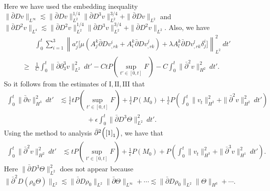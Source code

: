 \documentclass[12pt,a4paper]{amsart}
\numberwithin{equation}{section}
\theoremstyle{plain}
\theoremstyle{definition}
\newcommand{\bpartial}{\bar{\partial}}
\begin{document}
Here we have used the embedding inequality
$\|\bpartial Dv\|_{L^{\infty}}\lesssim\|\bpartial Dv\|_{L^2}^{1/4}\|\bpartial D^3v\|_{L^2}^{3/4}+\|\bpartial Dv\|_{L^2}$ and $\|\bpartial D^2v\|_{L^4}\lesssim\|\bpartial D^2v\|_{L^2}^{1/4}\|\bpartial D^3v\|_{L^2}^{3/4}+\|\bpartial D^2v\|_{L^2}$. Also, we have
\begin{align*}
&\int_{0}^{t}\sum\limits_{i=1}^3\left\| a^r_j\Big[\mu (A^{k}_j  \bpartial Dv^i_{,rk}+A^k_i \bpartial Dv^j_{,rk})+\lambda A_l^k \bpartial Dv^l_{,rk}\delta^i_j\Big]   \right\|_{L^2}^2 \ dt'\\
\geq & \frac{1}{C}\int_{0}^{t}\|\bpartial \partial_3^3 v\|_{L^2}^2 \ dt'-CtP(\sup\limits_{t'\in[0,t]}F)-C\int_{0}^{t} \|\bpartial^2 v\|_{H^2}^2 \ dt'.
\end{align*}
So it follows from the estimates of $\mathrm{I},\mathrm{II},\mathrm{III}$ that
\begin{equation}
\label{dvxxx2}
\begin{aligned}
\int_{0}^{t}\| \bpartial v\|_{H^3}^2 \ dt' &\lesssim \frac{1}{\epsilon}tP(\sup\limits_{t'\in[0,t]}F)+\frac{1}{\epsilon}P(M_0)+\frac{1}{\epsilon}P\left(\int_{0}^{t}\|v_{t}\|_{H^2}^2 +\|\bpartial^2 v\|_{H^2}^2\ dt'\right)\\
&\qquad\qquad+\epsilon \int_{0}^{t}\|\bpartial D^3\Theta\|_{L^2}^2 \ dt'.
\end{aligned}
\end{equation}
Using the method to analysis $\bpartial^2 \Big(\eqref{1}_1\Big)$, we have that
\begin{equation}
\label{dvxxx1}
\begin{aligned}
\int_{0}^{t}\| \bpartial^2 v\|_{H^2}^2 \ dt' &\lesssim tP(\sup\limits_{t'\in[0,t]}F)+\frac{1}{\epsilon}P(M_0)+P\left(\int_{0}^{t}\|v_{t}\|_{H^3}^2 +\|\bpartial^3 v\|_{H^1}^2\ dt'\right)
 .
\end{aligned}
\end{equation}
Here $\|\bpartial D^3\Theta\|_{L^2}^2$ does not appear because $\|\bpartial^2 D(\rho_0 \Theta)\|_{L^2}\lesssim \|\bpartial D\rho_0\|_{L^2}\|\bpartial\Theta\|_{L^{\infty}}+\cdots \lesssim \|\bpartial D\rho_0\|_{L^2}\|\Theta\|_{H^3}+\cdots$.

\vspace{0.3cm}
\end{document}
